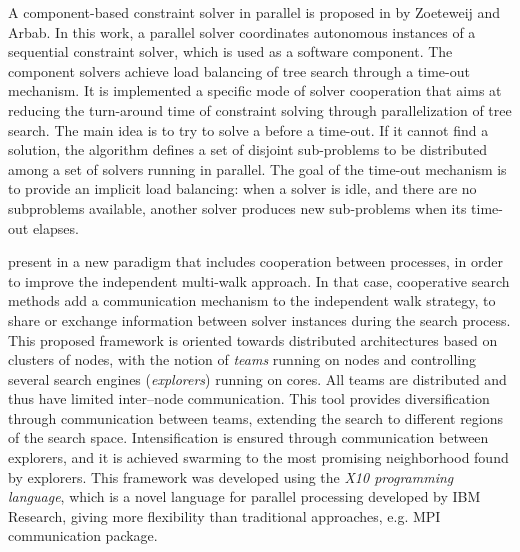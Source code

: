 A component-based constraint solver in parallel is proposed in \cite{Zoeteweij} by Zoeteweij and Arbab. In this work, a parallel solver coordinates autonomous instances of a sequential constraint solver, which is used as a software component. The component solvers achieve load balancing of tree search through a time-out mechanism. It is implemented a specific mode of solver cooperation that aims at reducing the turn-around time of constraint solving through parallelization of tree search. The main idea is to try to solve a \csp{} before a time-out. If it cannot find a solution, the algorithm defines a set of disjoint sub-problems to be distributed among a set of solvers running in parallel. The goal of the time-out mechanism is to provide an implicit load balancing: when a solver is idle, and there are no subproblems available, another solver produces new sub-problems when its time-out elapses.


 present in \cite{Munera} a new paradigm that includes cooperation between processes, in order to improve the independent multi-walk approach. In that case, cooperative search methods add a communication mechanism to the independent walk strategy, to share or exchange information between solver instances during the search process. This proposed framework is oriented towards distributed architectures based on clusters of nodes, with the notion of {\it teams} running on nodes and controlling several search engines ({\it explorers}) running on cores. All teams are distributed and thus have limited inter--node communication. This tool provides diversification through communication between teams, extending the search to different regions of the search space. Intensification is ensured through communication between explorers, and it is achieved swarming to the most promising neighborhood found by explorers. %
This framework was developed using the {\it X10 programming language}, which is a novel language for parallel processing developed by IBM Research, giving more flexibility than traditional approaches, e.g. MPI communication package.

